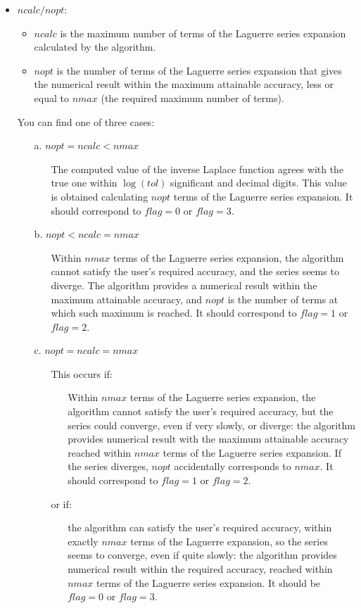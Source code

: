 \documentclass[10pt]{article}
\begin{document}
\begin{description}
\begin{itemize}
\item  $ncalc / nopt$:
\begin{itemize}
\item	$ncalc$ is the maximum number of terms of the Laguerre series expansion calculated by the algorithm.
\item	$nopt$ is the number of terms of the Laguerre series expansion that gives the numerical result within the maximum attainable accuracy, less or equal to $nmax$ (the required maximum number of terms).
\end{itemize}
You can find one of three cases:
\begin{itemize}
\item[a.] $nopt=ncalc<nmax$
\begin{itemize}
\item[] The computed  value of the inverse Laplace function agrees with the true one within $\log(tol)$ significant and decimal digits. This value is obtained calculating $nopt$ terms of the Laguerre series expansion. It should correspond to $flag = 0$ or $flag = 3$.
\end{itemize}

\item[b.] $nopt<ncalc=nmax$
\begin{itemize}
\item[] Within $nmax$ terms of the Laguerre series expansion, the algorithm cannot satisfy the user's required accuracy, and the series seems to diverge. The algorithm provides a numerical result within  the maximum attainable accuracy, and $nopt$ is the  number of terms at which such maximum is reached. It should correspond to $flag = 1$ or $flag = 2$.
\end{itemize}

\item[c.] $nopt=ncalc=nmax$
\begin{itemize}
\item[]	This occurs if:
\begin{itemize}
\item[] Within $nmax$ terms of the Laguerre series expansion, the algorithm cannot satisfy the user's required accuracy, but the series could converge, even if very slowly, or diverge: the algorithm provides numerical result with the maximum attainable accuracy reached within $nmax$ terms of the Laguerre series expansion. If the series diverges, $nopt$ accidentally corresponds to $nmax$.
It should correspond to $flag = 1$ or $flag = 2$.
	\end{itemize}
\item[] 			or if:
\begin{itemize}
\item[] the algorithm can satisfy the user's required accuracy, within exactly $nmax$ terms of the Laguerre expansion, so the series seems to converge, even if quite slowly: the algorithm provides numerical result within the required accuracy, reached within $nmax$ terms of the Laguerre series expansion. It should be $flag = 0$ or $flag = 3$.
\end{itemize}


\end{itemize}
\end{itemize}
\end{itemize}
\end{description}
\end{document}
